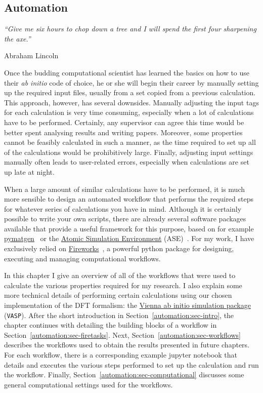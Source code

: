 \begin{refsection}

\chapter{Automation}

\setlength{\epigraphwidth}{3in}
\epigraph{\textit{``Give me six hours to chop down a tree and I will spend the first four sharpening the axe.''}}{Abraham Lincoln}
\vspace{3em}

Once the budding computational scientist has learned the basics on how to use their \textit{ab initio} code of choice, he or she will begin their career by manually setting up the required input files, usually from a set copied from a previous calculation. This approach, however, has several downsides. Manually adjusting the input tags for each calculation is very time consuming, especially when a lot of calculations have to be performed. Certainly, any supervisor can agree this time would be better spent analysing results and writing papers. Moreover, some properties cannot be feasibly calculated in such a manner, as the time required to set up all of the calculations would be prohibitively large. Finally, adjusting input settings manually often leads to user-related errors, especially when calculations are set up late at night. 

When a large amount of similar calculations have to be performed, it is much more sensible to design an automated workflow that performs the required steps for whatever series of calculations you have in mind. Although it is certainly possible to write your own scripts, there are already several software packages available that provide a useful framework for this purpose, based on for example \href{http://pymatgen.org/}{pymatgen}~\cite{Ong2013} or the \href{https://wiki.fysik.dtu.dk/ase/}{Atomic Simulation Environment} (ASE)~\cite{Larsen2017}. For my work, I have exclusively relied on \href{https://materialsproject.github.io/fireworks/index.html}{Fireworks}~\cite{Jain2015}, a powerful python package for designing, executing and managing computational workflows.

In this chapter I give an overview of all of the workflows that were used to calculate the various properties required for my research. I also explain some more technical details of performing certain calculations using our chosen implementation of the DFT formalism: the \href{https://www.vasp.at/}{Vienna ab initio simulation package} (\texttt{VASP}). After the short introduction in Section~\ref{automation:sec-intro}, the chapter continues with detailing the building blocks of a workflow in Section~\ref{automation:sec-firetasks}. Next, Section~\ref{automation:sec-workflows} describes the workflows used to obtain the results presented in future chapters. For each workflow, there is a corresponding example jupyter notebook that details and executes the various steps performed to set up the calculation and run the workflow. Finally, Section~\ref{automation:sec-computational} discusses some general computational settings used for the workflows.


\end{refsection}
